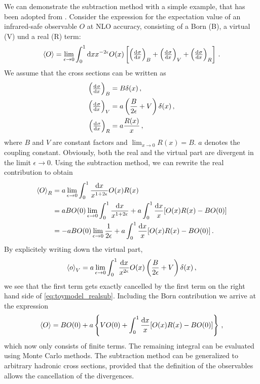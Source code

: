 We can demonstrate the subtraction method with a simple example, that has been adopted from \cite{mcatnlo}.
Consider the expression for the expectation value of an infrared-safe observable $O$ at NLO accuracy, consisting of a Born (B), a virtual (V) und a real (R) term:
%
\begin{equation}
	\left< O \right> = \lim_{\epsilon \rightarrow 0} \int_0^1 \dif x x^{-2 \epsilon} O(x) \left[ \left( \od{\sigma}{x} \right)_B + \left( \od{\sigma}{x} \right)_V + \left( \od{\sigma}{x} \right)_R \right] \, .
\end{equation}
%
We assume that the cross sections can be written as
%
\begin{align}
	\left( \od{\sigma}{x} \right)_B &= B \delta(x) \, , \\
	\left( \od{\sigma}{x} \right)_V &= a \left( \frac{B}{2 \epsilon} + V \right) \delta(x) \, , \\
	\left( \od{\sigma}{x} \right)_R &= a \frac{R(x)}{x} \, ,
\end{align}
%
where $B$ and $V$ are constant factors and $\lim_{x \rightarrow 0} R(x) = B$.
$a$ denotes the coupling constant.
Obviously, both the real and the virtual part are divergent in the limit $\epsilon \rightarrow 0$.
Using the subtraction method, we can rewrite the real contribution to obtain
%
\begin{align}
	\left< O \right>_R	&= a \lim_{\epsilon \rightarrow 0} \int_0^1 \frac{\dif x}{x^{1+2 \epsilon}} O(x) R(x) \nonumber \\
						&= a B O(0) \lim_{\epsilon \rightarrow 0} \int_0^1 \frac{\dif x}{x^{1+2 \epsilon}} + a \int_0^1 \frac{\dif x}{x} [O(x) R(x) - B O(0)] \nonumber \\
						&= -a B O(0) \lim_{\epsilon \rightarrow 0} \frac{1}{2 \epsilon} + a \int_0^1 \frac{\dif x}{x} [O(x) R(x) - B O(0)] \, .
	\label{eq:toymodel_realsub}
\end{align}
%
By explicitely writing down the virtual part,
%
\begin{equation}
	\left< o \right>_V = a \lim_{\epsilon \rightarrow 0} \int_0^1 \frac{\dif x}{x^{2 \epsilon}} O(x) \left( \frac{B}{2 \epsilon} + V \right) \delta(x) \, ,
\end{equation}
%
we see that the first term gets exactly cancelled by the first term on the right hand side of \eqref{eq:toymodel_realsub}.
Including the Born contribution we arrive at the expression
%
\begin{equation}
	\left< O \right> = B O(0) + a \left\{ V O(0) + \int_0^1 \frac{\dif x}{x} [O(x) R(x) - B O(0)] \right\} \, ,
\end{equation}
%
which now only consists of finite terms.
The remaining integral can be evaluated using Monte Carlo methods.
The subtraction method can be generalized to arbitrary hadronic cross sections, provided that the definition of the observables allows the cancellation of the divergences.
%
